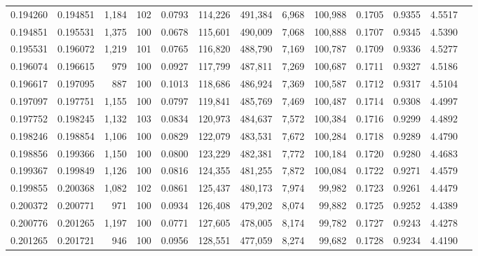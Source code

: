 \begin{tabular}{rrrrrrrrrrrrr}
0.194260 & 0.194851 & 1,184 & 102 &                                     0.0793 & 114,226 & 491,384 &   6,968 & 100,988 & 0.1705 & 0.9355 & 4.5517 \\
0.194851 & 0.195531 & 1,375 & 100 &                                     0.0678 & 115,601 & 490,009 &   7,068 & 100,888 & 0.1707 & 0.9345 & 4.5390 \\
0.195531 & 0.196072 & 1,219 & 101 &                                     0.0765 & 116,820 & 488,790 &   7,169 & 100,787 & 0.1709 & 0.9336 & 4.5277 \\
0.196074 & 0.196615 &   979 & 100 &                                     0.0927 & 117,799 & 487,811 &   7,269 & 100,687 & 0.1711 & 0.9327 & 4.5186 \\
0.196617 & 0.197095 &   887 & 100 &                                     0.1013 & 118,686 & 486,924 &   7,369 & 100,587 & 0.1712 & 0.9317 & 4.5104 \\
0.197097 & 0.197751 & 1,155 & 100 &                                     0.0797 & 119,841 & 485,769 &   7,469 & 100,487 & 0.1714 & 0.9308 & 4.4997 \\
0.197752 & 0.198245 & 1,132 & 103 &                                     0.0834 & 120,973 & 484,637 &   7,572 & 100,384 & 0.1716 & 0.9299 & 4.4892 \\
0.198246 & 0.198854 & 1,106 & 100 &                                     0.0829 & 122,079 & 483,531 &   7,672 & 100,284 & 0.1718 & 0.9289 & 4.4790 \\
0.198856 & 0.199366 & 1,150 & 100 &                                     0.0800 & 123,229 & 482,381 &   7,772 & 100,184 & 0.1720 & 0.9280 & 4.4683 \\
0.199367 & 0.199849 & 1,126 & 100 &                                     0.0816 & 124,355 & 481,255 &   7,872 & 100,084 & 0.1722 & 0.9271 & 4.4579 \\
0.199855 & 0.200368 & 1,082 & 102 &                                     0.0861 & 125,437 & 480,173 &   7,974 &  99,982 & 0.1723 & 0.9261 & 4.4479 \\
0.200372 & 0.200771 &   971 & 100 &                                     0.0934 & 126,408 & 479,202 &   8,074 &  99,882 & 0.1725 & 0.9252 & 4.4389 \\
0.200776 & 0.201265 & 1,197 & 100 &                                     0.0771 & 127,605 & 478,005 &   8,174 &  99,782 & 0.1727 & 0.9243 & 4.4278 \\
0.201265 & 0.201721 &   946 & 100 &                                     0.0956 & 128,551 & 477,059 &   8,274 &  99,682 & 0.1728 & 0.9234 & 4.4190 \\

\end{tabular}
